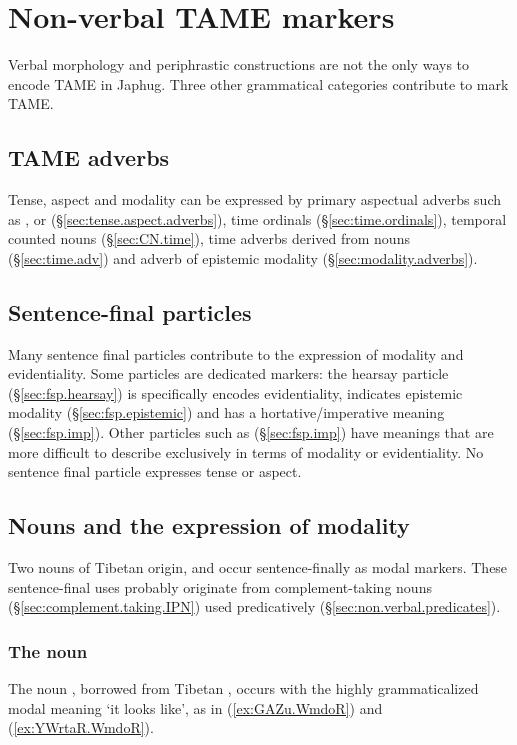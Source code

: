 \section{Non-verbal TAME markers}  \label{sec:non.verb.TAME}
Verbal morphology and periphrastic constructions are not the only ways to encode TAME in Japhug. Three other grammatical categories contribute to mark TAME. 


\subsection{TAME adverbs} 
Tense, aspect and modality can be expressed by primary aspectual adverbs such as ,  or  (§\ref{sec:tense.aspect.adverbs}), time ordinals (§\ref{sec:time.ordinals}), temporal counted nouns (§\ref{sec:CN.time}), time adverbs derived from nouns (§\ref{sec:time.adv}) and adverb of epistemic modality (§\ref{sec:modality.adverbs}).


\subsection{Sentence-final particles} 
Many sentence final particles contribute to the expression of modality and evidentiality. Some particles are dedicated markers: the hearsay particle  (§\ref{sec:fsp.hearsay}) is specifically encodes evidentiality,   indicates epistemic modality (§\ref{sec:fsp.epistemic}) and  has a hortative/imperative meaning (§\ref{sec:fsp.imp}). Other particles such as  (§\ref{sec:fsp.imp}) have meanings that are more difficult to describe exclusively in terms of modality or evidentiality. No sentence final particle expresses tense or aspect.


\subsection{Nouns and the expression of modality} \label{sec:nouns.TAME}
Two nouns of Tibetan origin,  and  occur sentence-finally as modal markers. These sentence-final uses probably originate from complement-taking nouns (§\ref{sec:complement.taking.IPN}) used predicatively (§\ref{sec:non.verbal.predicates}).

\subsubsection{The noun  } \label{sec:WmdoR.TAME}
The noun , borrowed from Tibetan , occurs with the highly grammaticalized modal meaning `it looks like', as in (\ref{ex:GAZu.WmdoR}) and (\ref{ex:YWrtaR.WmdoR}).  


